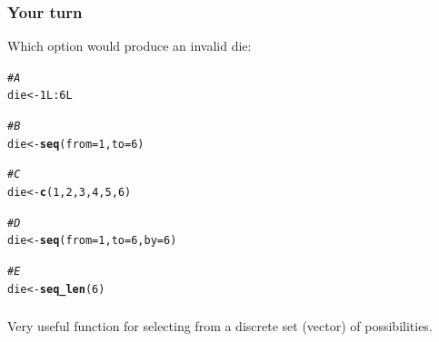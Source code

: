 \documentclass[12pt]{beamer}\usepackage[]{graphicx}\usepackage[]{color}
\makeatletter
\newcommand{\hlnum}[1]{\textcolor[rgb]{0.686,0.059,0.569}{#1}}%
\newcommand{\hlcom}[1]{\textcolor[rgb]{0.678,0.584,0.686}{\textit{#1}}}%
\newcommand{\hlopt}[1]{\textcolor[rgb]{0,0,0}{#1}}%
\newcommand{\hlstd}[1]{\textcolor[rgb]{0.345,0.345,0.345}{#1}}%
\newcommand{\hlkwb}[1]{\textcolor[rgb]{0.69,0.353,0.396}{#1}}%
\newcommand{\hlkwc}[1]{\textcolor[rgb]{0.333,0.667,0.333}{#1}}%
\newcommand{\hlkwd}[1]{\textcolor[rgb]{0.737,0.353,0.396}{\textbf{#1}}}%
\newenvironment{kframe}{%
 \def\at@end@of@kframe{}%
 \ifinner\ifhmode%
  \def\at@end@of@kframe{\end{minipage}}%
  \begin{minipage}{\columnwidth}%
 \fi\fi%
 \def\FrameCommand##1{\hskip\@totalleftmargin \hskip-\fboxsep
 \colorbox{shadecolor}{##1}\hskip-\fboxsep
     \hskip-\linewidth \hskip-\@totalleftmargin \hskip\columnwidth}%
 \MakeFramed {\advance\hsize-\width
   \@totalleftmargin\z@ \linewidth\hsize
   \@setminipage}}%
 {\par\unskip\endMakeFramed%
 \at@end@of@kframe}
\newenvironment{knitrout}{}{} %
\makeatother
\begin{document}

\begin{frame}[fragile]
\frametitle{Your turn}

Which option would produce an invalid die:
\begin{knitrout}\footnotesize
{}\color{fgcolor}\begin{kframe}
\begin{alltt}
\hlcom{# A}
\hlstd{die} \hlkwb{<-} \hlnum{1L}\hlopt{:}\hlnum{6L}

\hlcom{# B}
\hlstd{die} \hlkwb{<-} \hlkwd{seq}\hlstd{(}\hlkwc{from} \hlstd{=} \hlnum{1}\hlstd{,} \hlkwc{to} \hlstd{=} \hlnum{6}\hlstd{)}

\hlcom{# C}
\hlstd{die} \hlkwb{<-} \hlkwd{c}\hlstd{(}\hlnum{1}\hlstd{,} \hlnum{2}\hlstd{,} \hlnum{3}\hlstd{,} \hlnum{4}\hlstd{,} \hlnum{5}\hlstd{,} \hlnum{6}\hlstd{)}

\hlcom{# D}
\hlstd{die} \hlkwb{<-} \hlkwd{seq}\hlstd{(}\hlkwc{from} \hlstd{=} \hlnum{1}\hlstd{,} \hlkwc{to} \hlstd{=} \hlnum{6}\hlstd{,} \hlkwc{by} \hlstd{=} \hlnum{6}\hlstd{)}

\hlcom{# E}
\hlstd{die} \hlkwb{<-} \hlkwd{seq_len}\hlstd{(}\hlnum{6}\hlstd{)}
\end{alltt}
\end{kframe}
\end{knitrout}

\end{frame}


\begin{frame}
\begin{center}
\Large{}
\end{center}
\end{frame}


\begin{frame}[fragile]
\frametitle{}

Very useful function for selecting from a discrete set (vector) of possibilities.

\bi
  \item {}
  \item {}
  \item {}
  \item {}
\ei
\eb

\end{frame}
\end{document}
